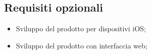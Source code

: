 \subsection{Requisiti opzionali}
\begin{itemize}
	\item Sviluppo del prodotto per dispositivi iOS;
	\item Sviluppo del prodotto con interfaccia web;
\end{itemize}